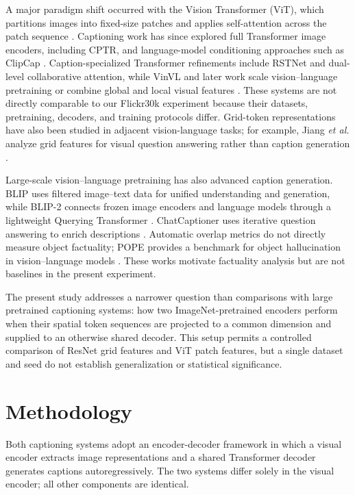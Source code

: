 \documentclass[conference]{IEEEtran}
\begin{document}
A major paradigm shift occurred with the Vision Transformer (ViT), which partitions images into fixed-size patches and applies self-attention across the patch sequence \cite{dosovitskiy2021}. Captioning work has since explored full Transformer image encoders, including CPTR, and language-model conditioning approaches such as ClipCap \cite{cptr2021,clipcap2021}. Caption-specialized Transformer refinements include RSTNet and dual-level collaborative attention, while VinVL and later work scale vision--language pretraining or combine global and local visual features \cite{rstnet2021,duallevel2021,vinvl2021,hu2022,nguyen2022,barraco2022}. These systems are not directly comparable to our Flickr30k experiment because their datasets, pretraining, decoders, and training protocols differ. Grid-token representations have also been studied in adjacent vision-language tasks; for example, Jiang \textit{et al.} analyze grid features for visual question answering rather than caption generation \cite{jiang2020grid}.

Large-scale vision--language pretraining has also advanced caption generation. BLIP uses filtered image--text data for unified understanding and generation, while BLIP-2 connects frozen image encoders and language models through a lightweight Querying Transformer \cite{li2022,li2023}. ChatCaptioner uses iterative question answering to enrich descriptions \cite{zhu2023}. Automatic overlap metrics do not directly measure object factuality; POPE provides a benchmark for object hallucination in vision--language models \cite{li2023pope}. These works motivate factuality analysis but are not baselines in the present experiment.

The present study addresses a narrower question than comparisons with large pretrained captioning systems: how two ImageNet-pretrained encoders perform when their spatial token sequences are projected to a common dimension and supplied to an otherwise shared decoder. This setup permits a controlled comparison of ResNet grid features and ViT patch features, but a single dataset and seed do not establish generalization or statistical significance.

\section{Methodology}

Both captioning systems adopt an encoder-decoder framework in which a visual encoder extracts image representations and a shared Transformer decoder generates captions autoregressively. The two systems differ solely in the visual encoder; all other components are identical.
\end{document}

